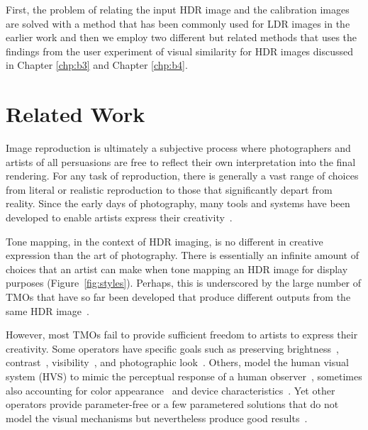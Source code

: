 First, the problem of relating the input HDR image and the calibration images are solved with a method that has been commonly used for LDR images in the earlier work and then we employ two different but related methods that uses the findings from the user experiment of visual similarity for HDR images discussed in Chapter \ref{chp:b3} and Chapter \ref{chp:b4}. 


\section{Related Work}
Image reproduction is ultimately a subjective process where photographers and artists of all persuasions are free to reflect their own interpretation into the final rendering. For any task of reproduction, there is generally a vast range of choices from literal or realistic reproduction to those that significantly depart from reality. Since the early days of photography, many tools and systems have been developed to enable artists express their creativity~\cite{Adams80,Adams81,Adams83,White84}.

Tone mapping, in the context of HDR imaging, is no different in creative expression than the art of photography. There is essentially an infinite amount of choices that an artist can make when tone mapping an HDR image for display purposes (Figure~\ref{fig:styles}). Perhaps, this is underscored by the large number of TMOs that have so far been developed that produce different outputs from the same HDR image~\cite{Rein2010}.

However, most TMOs fail to provide sufficient freedom to artists to express their creativity. Some operators have specific goals such as preserving brightness~\cite{Tumb93}, contrast~\cite{Duan2004}, visibility~\cite{Ward97,yang2018adaptive}, and photographic look~\cite{Rein2002a}. Others, model the human visual system (HVS) to mimic the perceptual response of a human observer~\cite{Ferw96,Patt98,Meylan2006,khan2017tone}, sometimes also accounting for color appearance~\cite{Kuang2007,Reinhard2012} and device characteristics~\cite{Mantiuk2008}. Yet other operators provide parameter-free or a few parametered solutions that do not model the visual mechanisms but nevertheless produce good results~\cite{Dura02,Fatt02}.


